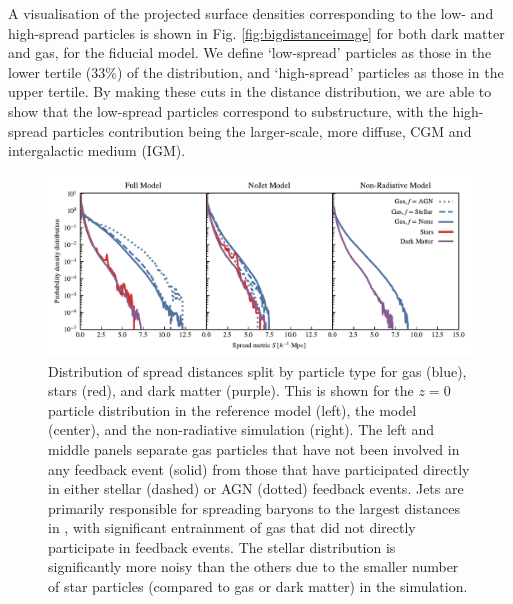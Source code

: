 A visualisation of the projected surface densities corresponding to the low-
and high-spread particles is shown in Fig. \ref{fig:bigdistanceimage} for
both dark matter and gas, for the fiducial \simba{} model. We define
`low-spread' particles as those in the lower tertile (33\%) of the
distribution, and `high-spread' particles as those in the upper tertile. By
making these cuts in the distance distribution, we are able to show that the
low-spread particles correspond to substructure, with the high-spread
particles contribution being the larger-scale, more diffuse, CGM and
intergalactic medium (IGM).


\begin{figure}
    \centering
    \includegraphics[width=\textwidth]{figures/neighbour_analysis_feedback_histogram_combined.pdf}
    \vspace{-0.7cm}
    \caption{Distribution of spread distances split by particle type for gas
    (blue), stars (red), and dark matter (purple). This is shown for the
    $z=0$ particle distribution in the reference model (left), the \nojet{}
    model (center), and the non-radiative simulation (right). The left and
    middle panels separate gas particles that have not been involved in any
    feedback event (solid) from those that have participated directly in
    either stellar (dashed) or AGN (dotted) feedback events. Jets are
    primarily responsible for spreading baryons to the largest distances in
    \simba{}, with significant entrainment of gas that did not directly
    participate in feedback events. The stellar distribution is significantly
    more noisy than the others due to the smaller number of star particles
    (compared to gas or dark matter) in the simulation.
    }\label{fig:feedbackdistance}
\end{figure}

